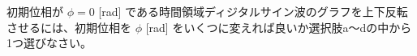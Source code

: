 初期位相が $\phi = 0$ [rad] である時間領域ディジタルサイン波のグラフを上下反転させるには、初期位相を $\phi$ [rad] をいくつに変えれば良いか選択肢a〜dの中から1つ選びなさい。
